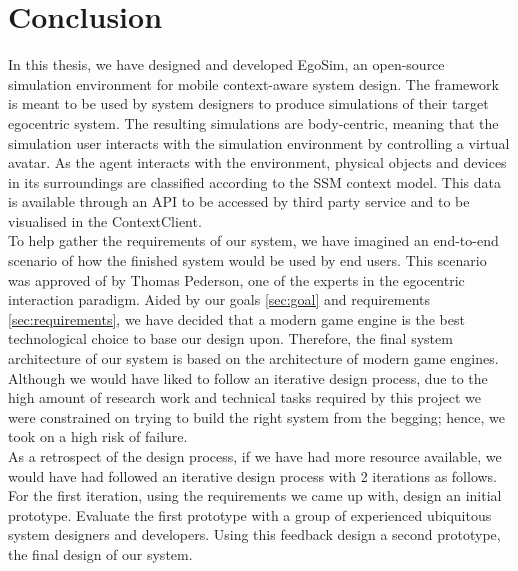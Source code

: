 \section{Conclusion} %
\label{sec:conclusion}

In this thesis, we have designed and developed EgoSim, an open-source simulation environment for mobile context-aware system design. The framework is meant to be used by system designers to produce simulations of their target egocentric system. The resulting simulations are body-centric, meaning that the simulation user interacts with the simulation environment by controlling a virtual avatar. As the agent interacts with the environment, physical objects and devices in its surroundings are classified according to the SSM context model. This data is available through an API to be accessed by third party service and to be visualised in the ContextClient.\\

To help gather the requirements of our system, we have imagined an end-to-end scenario of how the finished system would be used by end users. This scenario was approved of by Thomas Pederson, one of the experts in the egocentric interaction paradigm. Aided by our goals \ref{sec:goal} and requirements \ref{sec:requirements}, we have decided that a modern game engine is the best technological choice to base our design upon. Therefore, the final system architecture of our system is based on the architecture of modern game engines. Although we would have liked to follow an iterative design process, due to the high amount of research work and technical tasks required by this project we were constrained on trying to build the right system from the begging; hence, we took on a high risk of failure.\\

As a retrospect of the design process, if we have had more resource available, we would have had followed an iterative design process with 2 iterations as follows. For the first iteration, using the requirements we came up with, design an initial prototype. Evaluate the first prototype with a group of experienced ubiquitous system designers and developers. Using this feedback design a second prototype, the final design of our system.\\

